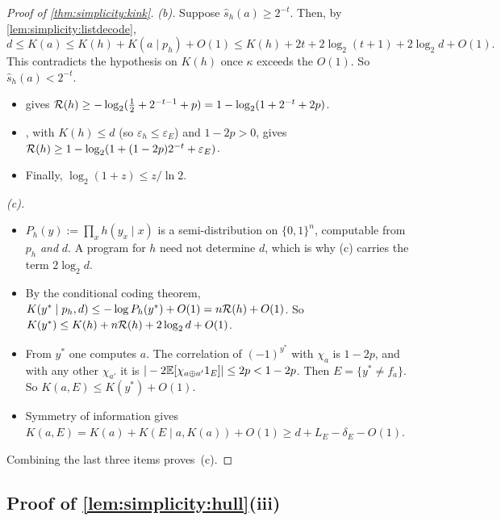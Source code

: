 \begin{proof}[Proof of \cref{thm:simplicity:kink}]
\emph{(b).} Suppose $\hat s_h(a)\ge2^{-t}$. Then, by \cref{lem:simplicity:listdecode},
\[
d\le K(a)\le K(h)+K(a\mid p_h)+O(1)\le K(h)+2t+2\log_2(t+1)+2\log_2d+O(1).
\]
This contradicts the hypothesis on $K(h)$ once $\kappa$ exceeds the $O(1)$. So $\hat s_h(a)<2^{-t}$.
\begin{itemize}
\item {} gives $\mathcal R(h)\ge-\log_2(\frac12+2^{-t-1}+p)=1-\log_2(1+2^{-t}+2p)$.
\item {}, with $K(h)\le d$ (so $\varepsilon_h\le\varepsilon_E$) and $1-2p>0$, gives $\mathcal R(h)\ge1-\log_2(1+(1-2p)2^{-t}+\varepsilon_E)$.
\item Finally, $\log_2(1+z)\le z/\ln2$.
\end{itemize}

\emph{(c).}
\begin{itemize}
\item $P_h(y):=\prod_xh(y_x\mid x)$ is a semi-distribution on $\{0,1\}^n$, computable from $p_h$ \emph{and} $d$. A program for $h$ need not determine $d$, which is why (c) carries the term $2\log_2d$.
\item By the conditional coding theorem, $K(y^*\mid p_h,d)\le-\log P_h(y^*)+O(1)=n\mathcal R(h)+O(1)$. So $K(y^*)\le K(h)+n\mathcal R(h)+2\log_2d+O(1)$.
\item From $y^*$ one computes $a$. The correlation of $(-1)^{y^*}$ with $\chi_a$ is $1-2p$, and with any other $\chi_{a'}$ it is $|-2\mathbb{E}[\chi_{a\oplus a'}1_E]|\le2p<1-2p$. Then $E=\{y^*\neq f_a\}$. So $K(a,E)\le K(y^*)+O(1)$.
\item Symmetry of information gives $K(a,E)=K(a)+K(E\mid a,K(a))+O(1)\ge d+L_E-\delta_E-O(1)$.
\end{itemize}
Combining the last three items proves~(c).
\end{proof}

\subsection{Proof of \texorpdfstring{\cref{lem:simplicity:hull}}{the hull lemma}(iii)}\label{app:simplicity:hull}

